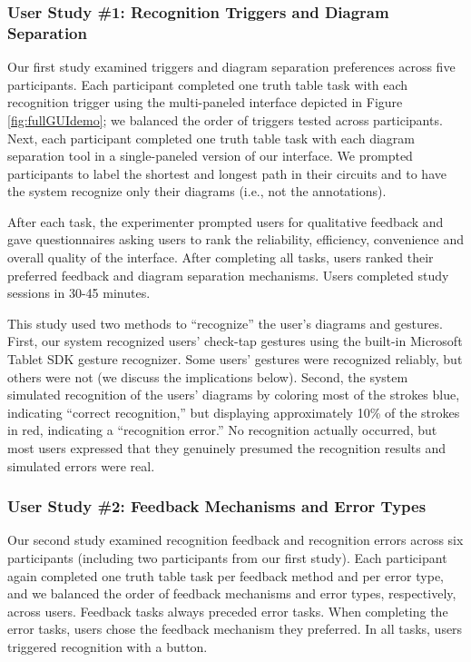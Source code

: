 \documentclass{elsart}
\begin{document}
\subsubsection{User Study \#1: Recognition Triggers and Diagram
  Separation} 
\label{sec:study1}
Our first study examined triggers and diagram separation preferences
across five participants.  Each participant completed one truth table
task with each recognition trigger using the multi-paneled interface
depicted in Figure \ref{fig:fullGUIdemo}; we balanced the order of
triggers tested across participants.  Next, each participant completed one
truth table task with each diagram separation tool in a single-paneled
version of our interface.  We prompted participants to label the
shortest and longest path in their circuits and to have the system
recognize only their diagrams (i.e., not the annotations).

After each task, the experimenter prompted users for qualitative
feedback and gave questionnaires asking users to rank the reliability,
efficiency, convenience and overall quality of the interface.  After
completing all tasks, users ranked their preferred feedback and
diagram separation mechanisms.  Users completed study sessions in
30-45 minutes.

This study used two methods to ``recognize'' the user's diagrams and
gestures.  First, our system recognized users' check-tap gestures
using the built-in Microsoft Tablet SDK gesture recognizer.  Some
users' gestures were recognized reliably, but others were not (we
discuss the implications below).  Second, the system simulated
recognition of the users' diagrams by coloring most of the strokes
blue, indicating ``correct recognition,'' but displaying approximately
10\% of the strokes in red, indicating a ``recognition error.''  No
recognition actually occurred, but most users expressed that they genuinely presumed
the recognition results and simulated errors were real.

\subsubsection{User Study \#2: Feedback Mechanisms and Error Types}
Our second study examined recognition feedback and recognition errors
across six participants (including two participants from our first
study).  Each participant again completed one truth table task per
feedback method and per error type, and we balanced the order of
feedback mechanisms and error types, respectively, across users.
Feedback tasks always preceded error tasks.  When completing the
error tasks, users chose the feedback mechanism they preferred.  In all
tasks, users triggered recognition with a button. 
\end{document}
